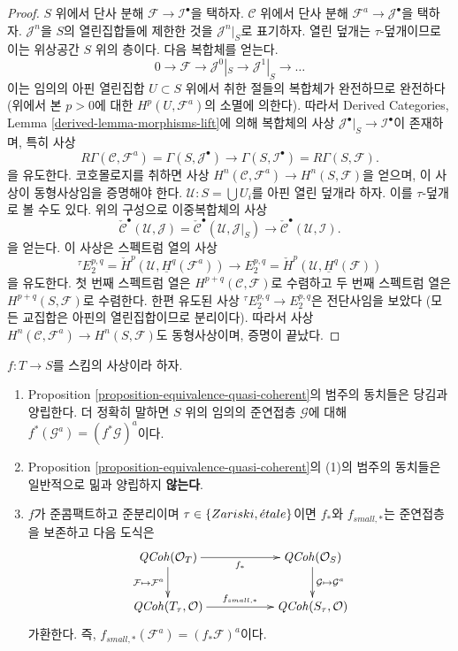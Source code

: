\begin{proof}
\medskip\noindent
$S$ 위에서 단사 분해 $\mathcal{F} \to \mathcal{I}^\bullet$을 택하자.
$\mathcal{C}$ 위에서 단사 분해 $\mathcal{F}^a \to \mathcal{J}^\bullet$을
택하자. $\mathcal{J}^n$을 $S$의 열린집합들에 제한한 것을
$\mathcal{J}^n|_S$로 표기하자. 열린 덮개는 $\tau$-덮개이므로 이는
위상공간 $S$ 위의 층이다. 다음 복합체를 얻는다.
$$
0 \to \mathcal{F} \to \mathcal{J}^0|_S \to \mathcal{J}^1|_S \to \ldots
$$
이는 임의의 아핀 열린집합 $U \subset S$ 위에서 취한 절들의 복합체가
완전하므로 완전하다(위에서 본 $p > 0$에 대한
$H^p(U, \mathcal{F}^a)$의 소멸에 의한다). 따라서 Derived Categories,
Lemma \ref{derived-lemma-morphisms-lift}에 의해 복합체의 사상
$\mathcal{J}^\bullet|_S \to \mathcal{I}^\bullet$이 존재하며, 특히 사상
$$
R\Gamma(\mathcal{C}, \mathcal{F}^a)
=
\Gamma(S, \mathcal{J}^\bullet)
\longrightarrow
\Gamma(S, \mathcal{I}^\bullet)
=
R\Gamma(S, \mathcal{F}).
$$
을 유도한다. 코호몰로지를 취하면 사상
$H^n(\mathcal{C}, \mathcal{F}^a) \to H^n(S, \mathcal{F})$을 얻으며,
이 사상이 동형사상임을 증명해야 한다.
$\mathcal{U} : S = \bigcup U_i$를 아핀 열린 덮개라 하자. 이를
$\tau$-덮개로 볼 수도 있다. 위의 구성으로 이중복합체의 사상
$$
\check{\mathcal{C}}^\bullet(\mathcal{U}, \mathcal{J})
=
\check{\mathcal{C}}^\bullet(\mathcal{U}, \mathcal{J}|_S)
\longrightarrow
\check{\mathcal{C}}^\bullet(\mathcal{U}, \mathcal{I}).
$$
을 얻는다. 이 사상은 스펙트럼 열의 사상
$$
{}^\tau\! E_2^{p, q} = \check{H}^p(\mathcal{U}, \underline{H}^q(\mathcal{F}^a))
\longrightarrow
E_2^{p, q} = \check{H}^p(\mathcal{U}, \underline{H}^q(\mathcal{F}))
$$
을 유도한다. 첫 번째 스펙트럼 열은
$H^{p + q}(\mathcal{C}, \mathcal{F})$로 수렴하고 두 번째 스펙트럼 열은
$H^{p + q}(S, \mathcal{F})$로 수렴한다. 한편 유도된 사상
${}^\tau\! E_2^{p, q} \to E_2^{p, q}$은 전단사임을 보았다
(모든 교집합은 아핀의 열린집합이므로 분리이다). 따라서 사상
$H^n(\mathcal{C}, \mathcal{F}^a) \to H^n(S, \mathcal{F})$도
동형사상이며, 증명이 끝났다.
\end{proof}

\begin{proposition}
\label{proposition-equivalence-quasi-coherent-functorial}
$f : T \to S$를 스킴의 사상이라 하자.
\begin{enumerate}
\item Proposition \ref{proposition-equivalence-quasi-coherent}의
범주의 동치들은 당김과 양립한다. 더 정확히 말하면 $S$ 위의 임의의
준연접층 $\mathcal{G}$에 대해
$f^*(\mathcal{G}^a) = (f^*\mathcal{G})^a$이다.
\item Proposition \ref{proposition-equivalence-quasi-coherent}의 (1)의
범주의 동치들은 일반적으로 밂과 양립하지 {\bf 않는다}.
\item $f$가 준콤팩트하고 준분리이며
$\tau \in \{Zariski, {\acute{e}tale}\}$이면 $f_*$와 $f_{small, *}$는
준연접층을 보존하고 다음 도식은
$$
\xymatrix{
\QCoh(\mathcal{O}_T)
\ar[rr]_{f_*} \ar[d]_{\mathcal{F} \mapsto \mathcal{F}^a} & &
\QCoh(\mathcal{O}_S)
\ar[d]^{\mathcal{G} \mapsto \mathcal{G}^a} \\
\QCoh(T_\tau, \mathcal{O}) \ar[rr]^{f_{small, *}} & &
\QCoh(S_\tau, \mathcal{O})
}
$$
가환한다. 즉, $f_{small, *}(\mathcal{F}^a) = (f_*\mathcal{F})^a$이다.
\end{enumerate}
\end{proposition}

